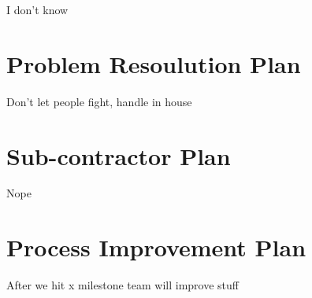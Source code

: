 I don't know


\section{Problem Resoulution Plan}

Don't let people fight, handle in house


\section{Sub-contractor Plan}

Nope


\section{Process Improvement Plan}

After we hit x milestone team will improve stuff


